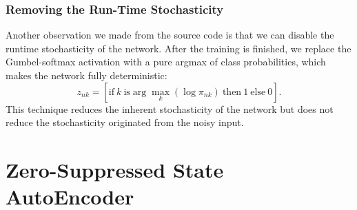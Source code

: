 \subsubsection{Removing the Run-Time Stochasticity}
\label{argmax}

Another observation we made from the source code is that we can
disable the runtime stochasticity of the network.
After the training is finished, we replace the Gumbel-softmax activation with
a pure argmax of class probabilities, which makes the network fully deterministic:
\[
 z_{nk} = [ \text{if}\ k\ \text{is} \arg \max_k (\log \pi_{nk})\ \text{then}\ 1\ \text{else}\ 0 ].
\]
% 
This technique reduces the inherent stochasticity of the network
but does not reduce the stochasticity originated from the noisy input.

\section{Zero-Suppressed State AutoEncoder}
\label{zsae}


